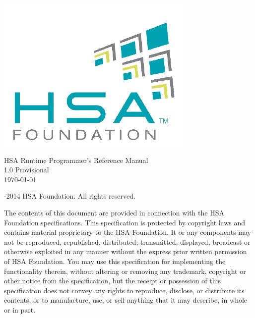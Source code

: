 \documentclass[final,oneside]{book}
\newcommand{\doctitle}{HSA Runtime Programmer's Reference Manual}
\begin{document}
\providecommand{\DIFadd}[1]{{\protect\color{Cerulean}#1}}
\renewcommand{\DIFadd}[1]{{\protect\color{Cerulean}#1}}


\begin{titlepage}
\includegraphics[width=.4\textwidth]{fig/foundation.png}
\vspace*{7cm}
\begin{center}
{\Large \doctitle\\[1ex]\large 1.0 Provisional}\\ %
\vspace*{1cm}
\vspace*{0.5cm}
{\small \today}
\end{center}
\end{titlepage}
\thispagestyle{empty} {-2014 HSA Foundation. All rights
  reserved.}


The contents of this document are provided in connection with the HSA Foundation
specifications. This specification is protected by copyright laws and contains
material proprietary to the HSA Foundation. It or any components may not be
reproduced, republished, distributed, transmitted, displayed, broadcast or
otherwise exploited in any manner without the express prior written permission
of HSA Foundation. You may use this specification for implementing the
functionality therein, without altering or removing any trademark, copyright or
other notice from the specification, but the receipt or possession of this
specification does not convey any rights to reproduce, disclose, or distribute
its contents, or to manufacture, use, or sell anything that it may describe, in
whole or in part.
\end{document}
